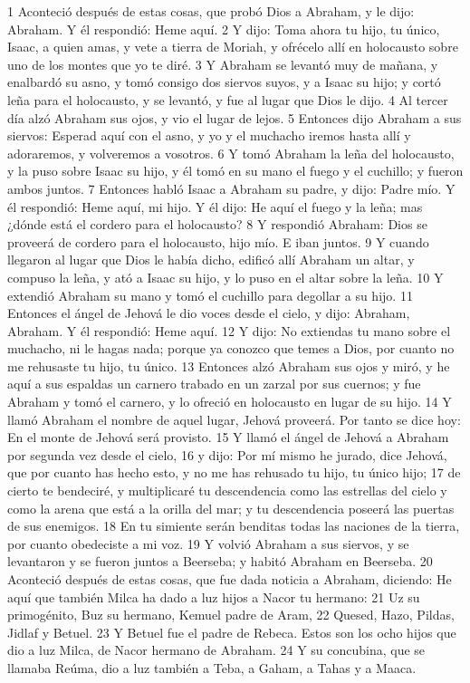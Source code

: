 1 Aconteció después de estas cosas, que probó Dios a Abraham, y le dijo: Abraham. Y él respondió: Heme aquí.
2 Y dijo: Toma ahora tu hijo, tu único, Isaac, a quien amas, y vete a tierra de Moriah, y ofrécelo allí en holocausto sobre uno de los montes que yo te diré.
3 Y Abraham se levantó muy de mañana, y enalbardó su asno, y tomó consigo dos siervos suyos, y a Isaac su hijo; y cortó leña para el holocausto, y se levantó, y fue al lugar que Dios le dijo.
4 Al tercer día alzó Abraham sus ojos, y vio el lugar de lejos.
5 Entonces dijo Abraham a sus siervos: Esperad aquí con el asno, y yo y el muchacho iremos hasta allí y adoraremos, y volveremos a vosotros.
6 Y tomó Abraham la leña del holocausto, y la puso sobre Isaac su hijo, y él tomó en su mano el fuego y el cuchillo; y fueron ambos juntos.
7 Entonces habló Isaac a Abraham su padre, y dijo: Padre mío. Y él respondió: Heme aquí, mi hijo. Y él dijo: He aquí el fuego y la leña; mas ¿dónde está el cordero para el holocausto?
8 Y respondió Abraham: Dios se proveerá de cordero para el holocausto, hijo mío. E iban juntos.
9 Y cuando llegaron al lugar que Dios le había dicho, edificó allí Abraham un altar, y compuso la leña, y ató a Isaac su hijo, y lo puso en el altar sobre la leña.
10 Y extendió Abraham su mano y tomó el cuchillo para degollar a su hijo.
11 Entonces el ángel de Jehová le dio voces desde el cielo, y dijo: Abraham, Abraham. Y él respondió: Heme aquí.
12 Y dijo: No extiendas tu mano sobre el muchacho, ni le hagas nada; porque ya conozco que temes a Dios, por cuanto no me rehusaste tu hijo, tu único.
13 Entonces alzó Abraham sus ojos y miró, y he aquí a sus espaldas un carnero trabado en un zarzal por sus cuernos; y fue Abraham y tomó el carnero, y lo ofreció en holocausto en lugar de su hijo.
14 Y llamó Abraham el nombre de aquel lugar, Jehová proveerá. Por tanto se dice hoy: En el monte de Jehová será provisto.
15 Y llamó el ángel de Jehová a Abraham por segunda vez desde el cielo,
16 y dijo: Por mí mismo he jurado, dice Jehová, que por cuanto has hecho esto, y no me has rehusado tu hijo, tu único hijo;
17 de cierto te bendeciré, y multiplicaré tu descendencia como las estrellas del cielo y como la arena que está a la orilla del mar; y tu descendencia poseerá las puertas de sus enemigos.
18 En tu simiente serán benditas todas las naciones de la tierra, por cuanto obedeciste a mi voz.
19 Y volvió Abraham a sus siervos, y se levantaron y se fueron juntos a Beerseba; y habitó Abraham en Beerseba.
20 Aconteció después de estas cosas, que fue dada noticia a Abraham, diciendo: He aquí que también Milca ha dado a luz hijos a Nacor tu hermano:
21 Uz su primogénito, Buz su hermano, Kemuel padre de Aram,
22 Quesed, Hazo, Pildas, Jidlaf y Betuel.
23 Y Betuel fue el padre de Rebeca. Estos son los ocho hijos que dio a luz Milca, de Nacor hermano de Abraham.
24 Y su concubina, que se llamaba Reúma, dio a luz también a Teba, a Gaham, a Tahas y a Maaca.


